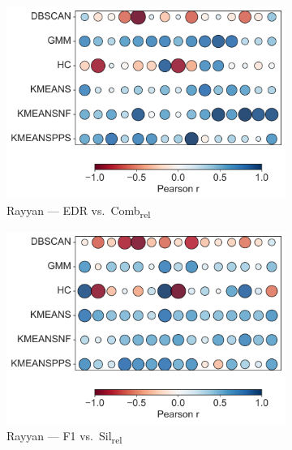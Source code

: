 \documentclass[10pt]{article} %
\numberwithin{equation}{section}
\begin{document}
\begin{figure}[htbp]
  \begin{subfigure}[b]{0.33\linewidth}
    \includegraphics[width=\linewidth]{figures/6.4.3graph/RA_EDR_vs_Comb_relative.pdf}
    \caption{Rayyan — EDR vs.\ Comb\textsubscript{rel}}
    \label{fig:ra_edr_comb}
  \end{subfigure}\hfill
  \begin{subfigure}[b]{0.33\linewidth}
    \includegraphics[width=\linewidth]{figures/6.4.3graph/RA_F1_vs_Sil_relative.pdf}
    \caption{Rayyan — F1 vs.\ Sil\textsubscript{rel}}
    \label{fig:ra_f1_sil}
  \end{subfigure}\hfill
  \begin{subfigure}[b]{0.33\linewidth}

\end{subfigure}
\end{figure}
\end{document}
